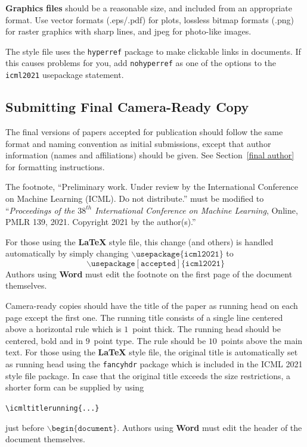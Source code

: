 \textbf{Graphics files} should be a reasonable size, and included from
an appropriate format. Use vector formats (.eps/.pdf) for plots,
lossless bitmap formats (.png) for raster graphics with sharp lines, and
jpeg for photo-like images.

The style file uses the \texttt{hyperref} package to make clickable
links in documents. If this causes problems for you, add
\texttt{nohyperref} as one of the options to the \texttt{icml2021}
usepackage statement.


\subsection{Submitting Final Camera-Ready Copy}

The final versions of papers accepted for publication should follow the
same format and naming convention as initial submissions, except that
author information (names and affiliations) should be given. See
Section~\ref{final author} for formatting instructions.

The footnote, ``Preliminary work. Under review by the International
Conference on Machine Learning (ICML). Do not distribute.'' must be
modified to ``\textit{Proceedings of the
$\mathit{38}^{th}$ International Conference on Machine Learning},
Online, PMLR 139, 2021.
Copyright 2021 by the author(s).''

For those using the \textbf{\LaTeX} style file, this change (and others) is
handled automatically by simply changing
$\mathtt{\backslash usepackage\{icml2021\}}$ to
$$\mathtt{\backslash usepackage[accepted]\{icml2021\}}$$
Authors using \textbf{Word} must edit the
footnote on the first page of the document themselves.

Camera-ready copies should have the title of the paper as running head
on each page except the first one. The running title consists of a
single line centered above a horizontal rule which is $1$~point thick.
The running head should be centered, bold and in $9$~point type. The
rule should be $10$~points above the main text. For those using the
\textbf{\LaTeX} style file, the original title is automatically set as running
head using the \texttt{fancyhdr} package which is included in the ICML
2021 style file package. In case that the original title exceeds the
size restrictions, a shorter form can be supplied by using

\verb|\icmltitlerunning{...}|

just before $\mathtt{\backslash begin\{document\}}$.
Authors using \textbf{Word} must edit the header of the document themselves.

